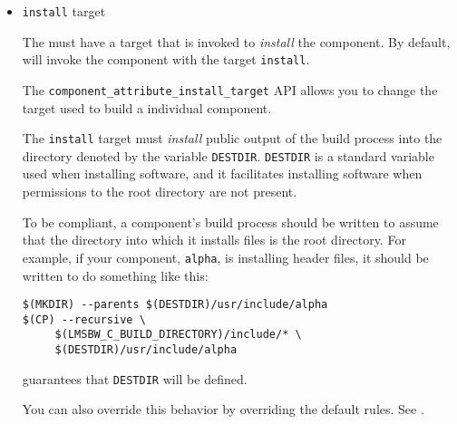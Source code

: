 \begin{itemize}
\item \texttt{install} target

  The \makefile must have a target that is invoked to \emph{install}
  the component.  By default, \lmsbw will invoke the component
  \makefile with the target \texttt{install}.

  The \texttt{component\_attribute\_install\_target} API allows you to
  change the target used to build a individual component.

  The \texttt{install} target must \emph{install} public output of the
  build process into the directory denoted by the \makefile variable
  \texttt{DESTDIR}.  \texttt{DESTDIR} is a standard \make variable
  used when installing software, and it facilitates installing
  software when permissions to the root directory are not present.

  To be compliant, a component's build process should be written to
  assume that the directory into which it installs files is the root
  directory.  For example, if your component, \texttt{alpha}, is
  installing header files, it should be written to do something like
  this:

\begin{verbatim}
$(MKDIR) --parents $(DESTDIR)/usr/include/alpha
$(CP) --recursive \
     $(LMSBW_C_BUILD_DIRECTORY)/include/* \
     $(DESTDIR)/usr/include/alpha
\end{verbatim}

  \lmsbw guarantees that \texttt{DESTDIR} will be defined.

  You can also override this behavior by overriding the default rules.
  See .

\end{itemize}

